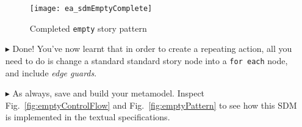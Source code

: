 \begin{itemize}
\begin{figure}[htbp]
\begin{center}
  \texttt{[image: ea\_sdmEmptyComplete]}
  \caption{Completed \texttt{empty} story pattern}  
  \label{fig:sdm_end}
\end{center}
\end{figure}
\FloatBarrier

\item[$\blacktriangleright$] Done! You've now learnt that in order to create a repeating action, all you need to do is change a standard standard story node
into a \texttt{for each} node, and include \emph{edge guards}. 

\item[$\blacktriangleright$] As always, save and build your metamodel. Inspect Fig.~\ref{fig:emptyControlFlow} and Fig.~\ref{fig:emptyPattern} to see how this
SDM is implemented in the textual specifications.


\end{itemize}

